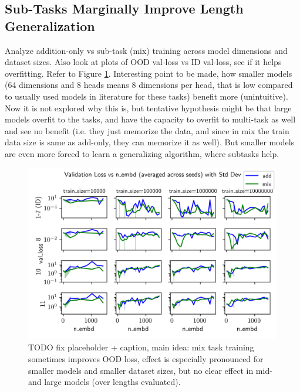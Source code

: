 

\subsection{Sub-Tasks Marginally Improve Length Generalization}
Analyze addition-only vs sub-task (mix) training across model dimensions and dataset sizes. Also look at plots of OOD val-loss vs ID val-loss, see if it helps overfitting. Refer to Figure \ref{fig:exp_27_val_loss_vs_n_embd}. Interesting point to be made, how smaller models (64 dimensions and 8 heads means 8 dimensions per head, that is low compared to usually used models in literature for these tasks) benefit more (unintuitive). Now it is not explored why this is, but tentative hypothesis might be that large models overfit to the tasks, and have the capacity to overfit to multi-task as well and see no benefit (i.e. they just memorize the data, and since in mix the train data size is same as add-only, they can memorize it as well). But smaller models are even more forced to learn a generalizing algorithm, where subtasks help.

\label{tab:subtask_results}


\begin{figure}[h!]
    \centering
    \includegraphics[width=\textwidth]{fig/exp_27_val_loss_vs_n_embd.png}
    \caption{TODO fix placeholder + caption, main idea: mix task training sometimes improves OOD loss, effect is especially pronounced for smaller models and smaller dataset sizes, but no clear effect in mid- and large models (over lengths evaluated).}
    \label{fig:exp_27_val_loss_vs_n_embd}
\end{figure}


